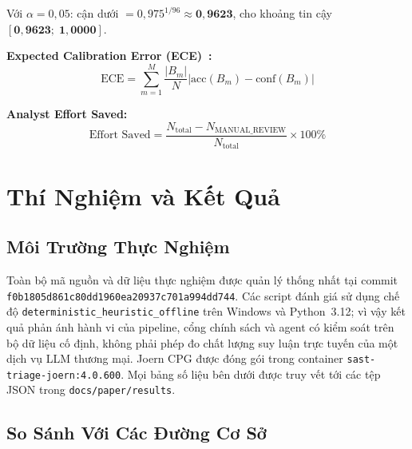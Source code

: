 \documentclass[12pt, a4paper]{article}
\begin{document}
Với $\alpha = 0{,}05$: cận dưới $= 0{,}975^{1/96} \approx \mathbf{0{,}9623}$,
cho khoảng tin cậy $\mathbf{[0{,}9623;\;1{,}0000]}$.

\noindent\textbf{Expected Calibration Error (ECE)~\cite{guo2017}:}
\begin{equation}
  \text{ECE} = \sum_{m=1}^{M} \frac{|B_m|}{N}
               \bigl|\text{acc}(B_m) - \text{conf}(B_m)\bigr|
  \label{eq:ece}
\end{equation}

\noindent\textbf{Analyst Effort Saved:}
\begin{equation}
  \text{Effort Saved} =
  \frac{N_{\text{total}} - N_{\text{MANUAL\_REVIEW}}}
       {N_{\text{total}}} \times 100\%
  \label{eq:effort}
\end{equation}

\section{Thí Nghiệm và Kết Quả}

\subsection{Môi Trường Thực Nghiệm}

Toàn bộ mã nguồn và dữ liệu thực nghiệm được quản lý thống nhất tại
commit \texttt{f0b1805d861c80dd1960ea20937c701a994dd744}. Các script
đánh giá sử dụng chế độ \texttt{deterministic\_heuristic\_offline} trên
Windows và Python~3.12; vì vậy kết quả phản ánh hành vi của pipeline,
cổng chính sách và agent có kiểm soát trên bộ dữ liệu cố định, không phải
phép đo chất lượng suy luận trực tuyến của một dịch vụ LLM thương mại.
Joern CPG được đóng gói trong container
\texttt{sast-triage-joern:4.0.600}. Mọi bảng số liệu bên dưới được truy
vết tới các tệp JSON trong \texttt{docs/paper/results}.

\subsection{So Sánh Với Các Đường Cơ Sở}
\end{document}
